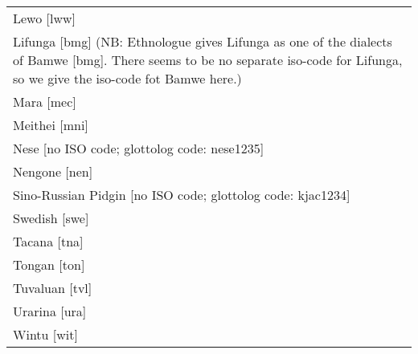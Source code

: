 ﻿\documentclass[output=paper]{langsci/langscibook}
\begin{document}
\begin{longtable}{@{} p{\textwidth} @{}}
Lewo [lww]\\
Lifunga [bmg] (NB: Ethnologue gives Lifunga as one of the dialects of
Bamwe [bmg]. There seems to be no separate iso-code for Lifunga, so we give
the iso-code fot Bamwe here.)\\
Mara [mec]\\
Meithei [mni]\\
Nese [no ISO code; glottolog code: nese1235]\\
Nengone [nen]\\
Sino-Russian Pidgin [no ISO code; glottolog code: kjac1234]\\
Swedish [swe]\\
Tacana [tna]\\
Tongan [ton]\\
Tuvaluan [tvl]\\
Urarina [ura]\\
Wintu [wit]
\end{longtable}

\printbibliography[heading=subbibliography,notcategory=online]
\printbibliography[heading=subbibliography,category=online,title={Sources}]
\end{document}
